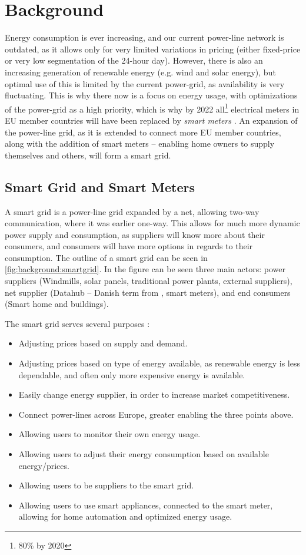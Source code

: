 \section{Background}
Energy consumption is ever increasing, and our current power-line network is outdated, as it allows only for very limited variations in pricing (either fixed-price or very low segmentation of the 24-hour day).
However, there is also an increasing generation of renewable energy (e.g. wind and solar energy), but optimal use of this is limited by the current power-grid, as availability is very fluctuating.
This is why there now is a focus on energy usage, with optimizations of the power-grid as a high priority, which is why by 2022 all\footnote{80\% by 2020} electrical meters in EU member countries will have been replaced by \textit{smart meters} \cite{smart_meter_survey} \cite{directive_2009_72_EC}.
An expansion of the power-line grid, as it is extended to connect more EU member countries, along with the addition of smart meters -- enabling home owners to supply themselves and others, will form a smart grid.

\subsection{Smart Grid and Smart Meters}
A smart grid is a power-line grid expanded by a net, allowing two-way communication, where it was earlier one-way.
This allows for much more dynamic power supply and consumption, as suppliers will know more about their consumers, and consumers will have more options in regards to their consumption.
The outline of a smart grid can be seen in \cref{fig:background:smartgrid}.
In the figure can be seen three main actors: power suppliers (Windmills, solar panels, traditional power plants, external suppliers), net supplier (Datahub -- Danish term from \cite{LOV_nr_575_af_18-06-2012}, smart meters), and end consumers (Smart home and buildings).

The smart grid serves several purposes \cite{smartgrid_gov} \cite{directive_2009_72_EC}:
\begin{itemize}
	\item Adjusting prices based on supply and demand.
	\item Adjusting prices based on type of energy available, as renewable energy is less dependable, and often only more expensive energy is available.
	\item Easily change energy supplier, in order to increase market competitiveness.
	\item Connect power-lines across Europe, greater enabling the three points above.
	\item Allowing users to monitor their own energy usage.
	\item Allowing users to adjust their energy consumption based on available energy/prices.
	\item Allowing users to be suppliers to the smart grid.
	\item Allowing users to use smart appliances, connected to the smart meter, allowing for home automation and optimized energy usage.
\end{itemize}

